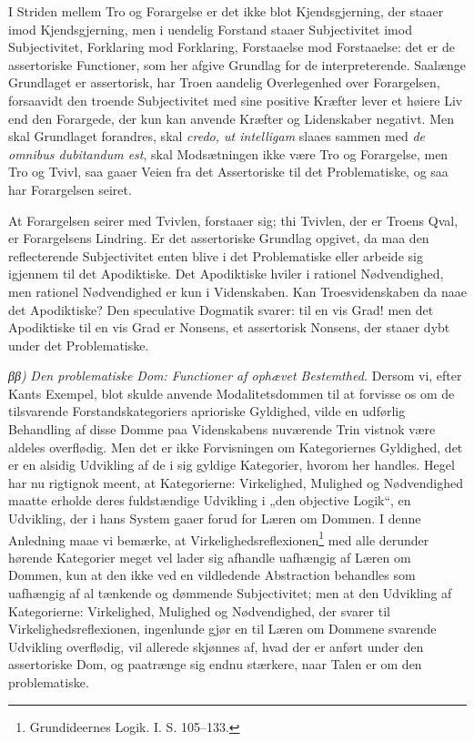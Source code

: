 \documentclass[12pt]{book}
\newcommand{\opage}[1]{\marginnote{\footnotesize\textit{[#1]}}}
\begin{document}
I Striden mellem Tro og Forargelse er det ikke blot
Kjendsgjerning, der staaer imod Kjendsgjerning, men i uendelig
Forstand staaer Subjectivitet imod Subjectivitet, Forklaring
mod Forklaring, Forstaaelse mod Forstaaelse: det er de assertoriske
Functioner, som her afgive Grundlag for de interpreterende.
Saalænge Grundlaget er assertorisk, har Troen
aandelig Overlegenhed over Forargelsen, forsaavidt den troende
Subjectivitet med sine positive Kræfter lever et høiere Liv end %
den Forargede, der kun kan anvende Kræfter og Lidenskaber
negativt. Men skal Grundlaget forandres, skal \textit{credo, ut
intelligam} slaaes sammen med \textit{de omnibus dubitandum est},
skal Modsætningen ikke være Tro og Forargelse, men Tro
og Tvivl, saa gaaer Veien fra det Assertoriske til det Problematiske,
og saa har Forargelsen seiret.

At Forargelsen seirer med Tvivlen, forstaaer sig; thi
Tvivlen, der er Troens Qval, er Forargelsens Lindring.
Er det assertoriske Grundlag opgivet, da maa den reflecterende
Subjectivitet enten blive i det Problematiske eller arbeide sig
igjennem til det Apodiktiske. Det Apodiktiske hviler i rationel
Nødvendighed, men rationel Nødvendighed er kun i Videnskaben.
Kan Troesvidenskaben da naae det Apodiktiske? Den
speculative Dogmatik svarer: til en vis Grad! men det Apodiktiske
til en vis Grad er Nonsens, et assertorisk Nonsens,
der staaer dybt under det Problematiske.

\textit{ββ)} \emph{Den problematiske Dom: Functioner af
ophævet Bestemthed.} Dersom vi, efter Kants Exempel,
blot skulde anvende Modalitetsdommen til at forvisse os om
de tilsvarende Forstandskategoriers aprioriske Gyldighed, vilde
en udførlig Behandling af disse Domme paa Videnskabens
nuværende Trin vistnok være aldeles overflødig. Men det
er ikke Forvisningen om Kategoriernes Gyldighed, det er en
alsidig Udvikling af de i sig gyldige Kategorier, hvorom her
\opage{211}handles. Hegel har nu rigtignok meent, at Kategorierne: Virkelighed, Mulighed og Nødvendighed maatte erholde deres fuldstændige Udvikling i „den objective Logik“, en Udvikling, der i hans System gaaer forud for Læren om Dommen. I denne Anledning maae vi bemærke, at Virkelighedsreflexionen\footnote{Grundideernes Logik. I. S. 105--133.}%
{} med alle derunder hørende Kategorier meget vel lader sig afhandle uafhængig af Læren om Dommen, kun at den ikke ved en vildledende Abstraction behandles som uafhængig af al tænkende og dømmende Subjectivitet; men at den Udvikling af Kategorierne: Virkelighed, Mulighed og Nødvendighed, der svarer til Virkelighedsreflexionen, ingenlunde gjør en til Læren om Dommene svarende Udvikling overflødig, vil allerede skjønnes af, hvad der er anført under den assertoriske Dom, og paatrænge sig endnu stærkere, naar Talen er om den problematiske.
\end{document}
